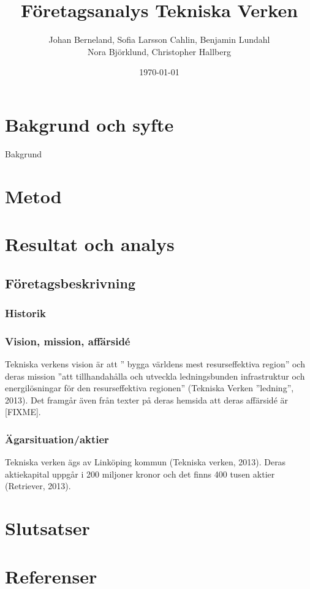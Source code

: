 \documentclass[10pt,a4paper]{article}
\title{Företagsanalys Tekniska Verken}
\author{Johan Berneland, Sofia Larsson Cahlin, Benjamin Lundahl \\
    Nora Björklund, Christopher Hallberg}
\date{\today}
\begin{document}
\maketitle

\newpage

\tableofcontents

\newpage

\section{Bakgrund och syfte}
Bakgrund

\section{Metod}

\section{Resultat och analys}
\subsection{Företagsbeskrivning}
\subsubsection{Historik}
\subsubsection{Vision, mission, affärsidé}
Tekniska verkens vision är att '' bygga världens mest resurseffektiva
region'' och deras mission ''att tillhandahålla och utveckla
ledningsbunden infrastruktur och energilösningar för den
resurseffektiva regionen'' (Tekniska Verken ''ledning'', 2013). Det framgår även
från texter på deras hemsida att deras affärsidé är [FIXME].
\subsubsection{Ägarsituation/aktier}
Tekniska verken ägs av Linköping kommun (Tekniska verken, 2013). Deras
aktiekapital uppgår i 200 miljoner kronor och det finns 400 tusen
aktier (Retriever, 2013).


\section{Slutsatser}

\section{Referenser}
\end{document}
